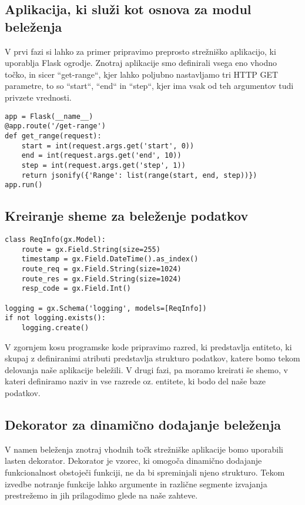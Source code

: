 \documentclass[a4paper,12pt,openright]{book}
\begin{document}
    \subsection{Aplikacija, ki služi kot osnova za modul beleženja}

    V prvi fazi si lahko za primer pripravimo preprosto strežniško aplikacijo, ki uporablja Flask \cite{FLASK_GITHUB} ogrodje. Znotraj aplikacije smo definirali vsega eno vhodno točko, in sicer ``get-range``, kjer lahko poljubno nastavljamo tri HTTP GET parametre, to so ``start``, ``end`` in ``step``, kjer ima vsak od teh argumentov tudi privzete vrednosti.
    
\begin{verbatim}
app = Flask(__name__)
@app.route('/get-range')
def get_range(request):
    start = int(request.args.get('start', 0))
    end = int(request.args.get('end', 10))
    step = int(request.args.get('step', 1))
    return jsonify({'Range': list(range(start, end, step))})
app.run()
\end{verbatim}

    \subsection{Kreiranje sheme za beleženje podatkov}
\begin{verbatim}
class ReqInfo(gx.Model):
    route = gx.Field.String(size=255)
    timestamp = gx.Field.DateTime().as_index()
    route_req = gx.Field.String(size=1024)
    route_res = gx.Field.String(size=1024)
    resp_code = gx.Field.Int()

logging = gx.Schema('logging', models=[ReqInfo])
if not logging.exists():
    logging.create()
\end{verbatim}

    \noindent
    V zgornjem kosu programske kode pripravimo razred, ki predstavlja entiteto, ki skupaj z definiranimi atributi predstavlja strukturo podatkov, katere bomo tekom delovanja naše aplikacije beležili. V drugi fazi, pa moramo kreirati še shemo, v kateri definiramo naziv in vse razrede oz. entitete, ki bodo del naše baze podatkov.

    \subsection{Dekorator za dinamično dodajanje beleženja}

    V namen beleženja znotraj vhodnih točk strežniške aplikacije bomo uporabili lasten dekorator.
    Dekorator je vzorec,  ki omogoča dinamično dodajanje funkcionalnost obstoječi funkciji, ne da bi spreminjali njeno strukturo. Tekom izvedbe notranje funkcije lahko argumente in različne segmente izvajanja prestrežemo in jih prilagodimo glede na naše zahteve.
    
\end{document}
